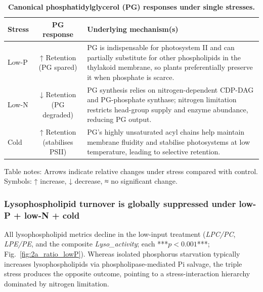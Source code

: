 \documentclass[10pt,letterpaper]{article}
\begin{document}
\begin{table}[!ht]
  \begin{adjustwidth}{-2.25in}{0in} %
    \centering
    \caption{{\bf Canonical phosphatidylglycerol (PG) responses under single stresses.}}
    \begin{tabular}{|l|c|p{4in}|}
      \hline
      \textbf{Stress} & \textbf{PG response} & \textbf{Underlying mechanism(s)} \\ \hline
      Low-P  & ↑ Retention (PG spared) & PG is indispensable for photosystem II and can partially substitute for other phospholipids in the thylakoid membrane, so plants preferentially preserve it when phosphate is scarce. \\ \hline
      Low-N  & ↓ Retention (PG degraded) & PG synthesis relies on nitrogen-dependent CDP-DAG and PG-phosphate synthase; nitrogen limitation restricts head-group supply and enzyme abundance, reducing PG output. \\ \hline
      Cold   & ↑ Retention (stabilises PSII) & PG’s highly unsaturated acyl chains help maintain membrane fluidity and stabilise photosystems at low temperature, leading to selective retention. \\ \hline
    \end{tabular}
    \begin{flushleft}
      Table notes: Arrows indicate relative changes under stress compared with control. Symbols: ↑ increase, ↓ decrease, ≈ no significant change.
    \end{flushleft}
    \label{table:PG_responses}
  \end{adjustwidth}
\end{table}


\subsubsection*{Lysophospholipid turnover is globally suppressed under low-P + low-N + cold}

All lysophospholipid metrics decline in the low-input treatment  
(\textit{LPC/PC}, \textit{LPE/PE}, and the composite \textit{Lyso\_activity};  
each ***$p<0.001$***; Fig.~\ref{fig:2a_ratio_lowP}).  
Whereas isolated phosphorus starvation typically increases lysophospholipids
via phospholipase-mediated Pi salvage, the triple stress produces the
opposite outcome, pointing to a stress-interaction hierarchy dominated by nitrogen
limitation.
\end{document}

